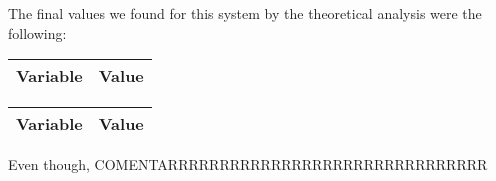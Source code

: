 The final values we found for this system by the theoretical analysis were the following:

\begin{tabular}{|l|r|}
	\hline    
    {\bf Variable} & {\bf Value} \\ \hline %
    
\end{tabular}

\begin{tabular}{|l|r|}
    \hline    
    {\bf Variable} & {\bf Value} \\ \hline %
    
\end{tabular}

Even though, COMENTARRRRRRRRRRRRRRRRRRRRRRRRRRRRRRR